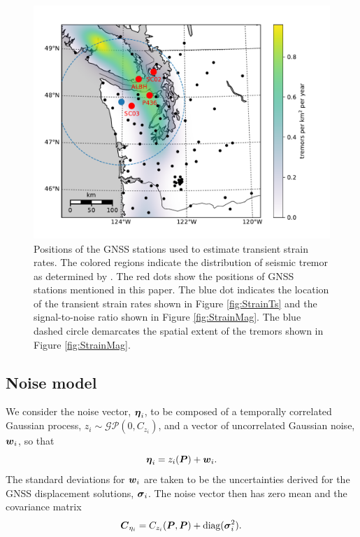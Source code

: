 \documentclass[extra,mreferee]{gji}
\begin{document}
\begin{figure}
\includegraphics{figures/context_map/context-map.pdf}
\caption{
Positions of the GNSS stations used to estimate transient strain
rates. The colored regions indicate the distribution of seismic tremor
as determined by \citet{Wech2010}. The red dots show the positions of
GNSS stations mentioned in this paper. The blue dot indicates the
location of the transient strain rates shown in Figure
\ref{fig:StrainTs} and the signal-to-noise ratio shown in Figure
\ref{fig:StrainMag}. The blue dashed circle demarcates the spatial
extent of the tremors shown in Figure \ref{fig:StrainMag}.
}    
\label{fig:Context}
\end{figure}

\subsection{Noise model}\label{sec:NoiseModel}


We consider the noise vector, $\mitbf{\eta}_i$, to be composed of a
temporally correlated Gaussian process, $z_i \sim
\mathcal{GP}(0,C_{z_i})$, and a vector of uncorrelated
Gaussian noise, $\mitbf{w}_i$, so that
\begin{equation}
\mitbf{\eta}_i = z_i(\points) + \mitbf{w}_i.
\end{equation}
The standard deviations for $\mitbf{w}_i$ are taken to be the
uncertainties derived for the GNSS displacement solutions,
$\mitbf{\sigma}_i$. The noise vector then has zero mean and the
covariance matrix
\begin{equation}
\mitbf{C}_{\eta_i} = C_{z_i}(\points,\points) +
                     \mathrm{diag}(\mitbf{\sigma}_i^2).
\end{equation}
\end{document}
